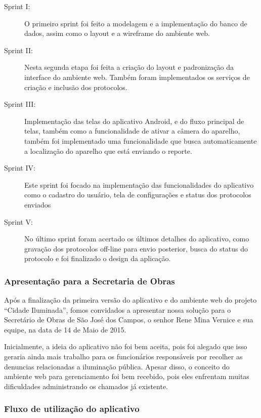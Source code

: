 \documentclass[
	article,			%
	11pt,				%
	oneside,			%
	a4paper,			%
	english,			%
	brazil,				%
	sumario=tradicional
	]{abntex2}
\begin{document}
\begin{description}
\item[Sprint I:]
O primeiro sprint foi feito a modelagem e a implementação do banco de dados, assim como o layout e a wireframe do ambiente web.

\item[Sprint II:]
Nesta segunda etapa foi feita a criação do layout e padronização da interface do ambiente web.
Também foram implementados os serviços de criação e inclusão dos protocolos.

\item[Sprint III:]
Implementação das telas do aplicativo Android, e do fluxo principal de telas, também como a funcionalidade de ativar a câmera do aparelho, também foi implementado uma funcionalidade que busca automaticamente a localização do aparelho que está enviando o reporte.

\item[Sprint IV:]
Este sprint foi focado na implementação das funcionalidades do aplicativo como o cadastro do usuário, tela de configurações e status dos protocolos enviados

\item[Sprint V:]
No último sprint foram acertado os últimos detalhes do aplicativo, como gravação dos protocolos off-line para envio posterior, busca do status do protocolo e foi finalizado o design da aplicação.
\end{description}

\subsubsection{Apresentação para a Secretaria de Obras}

Após a finalização da primeira versão do aplicativo e do ambiente web do projeto “Cidade Iluminada”, fomos convidados a apresentar nossa solução para o Secretário de Obras de São José dos Campos, o senhor Rene Mina Vernice e sua equipe, na data de 14 de Maio de 2015.

Inicialmente, a ideia do aplicativo não foi bem aceita, pois foi alegado que isso geraria ainda mais trabalho para os funcionários responsáveis por recolher as denuncias relacionadas a iluminação pública.
Apesar disso, o conceito do ambiente web para gerenciamento foi bem recebido, pois eles enfrentam muitas dificuldades administrando os chamados já existente.

\subsubsection{Fluxo de utilização do aplicativo}
\end{document}
